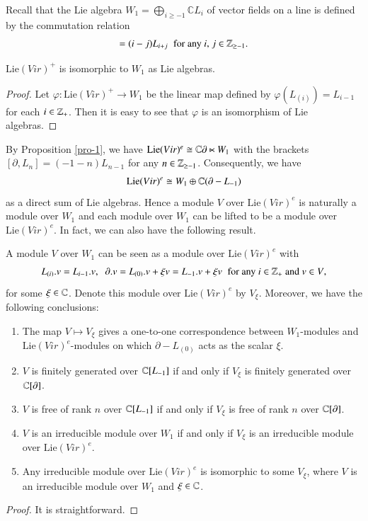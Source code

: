\documentclass[12pt]{amsart}
\begin{document}
Recall that the Lie algebra $W_1=\bigoplus_{i\geq -1}\mathbb{C}L_i$ of vector fields on a line is defined by the commutation relation
\begin{eqnarray*}
[L_i, L_j]=(i-j)L_{i+j}\;\;\text{for any $i$, $j\in \Z_{\geq -1}$.}
\end{eqnarray*}

\begin{pro}\label{pro-1}
$\text{Lie}( Vir)^+$ is isomorphic to $W_1$ as Lie algebras.
\end{pro}
\begin{proof}
Let $\varphi: \text{Lie}( Vir)^+\rightarrow W_1 $ be the linear map defined by $\varphi(L_{(i)})=L_{i-1}$ for each $i\in \mathbb{Z}_{+}$. Then it is easy to see that $\varphi$ is an isomorphism of Lie algebras.
\end{proof}

By Proposition \ref{pro-1}, we have $\text{Lie}( Vir)^e\cong \mathbb{C} \partial \ltimes W_1$ with
the brackets $[\partial, L_n]=(-1-n)L_{n-1}$ for any $n\in \mathbb{Z}_{\geq -1}$. Consequently, we have
$$\text{Lie}( Vir)^e\cong W_1\oplus \mathbb{C}(\partial-L_{-1})$$
as a direct sum of Lie algebras. Hence a module $V$ over $\text{Lie}( Vir)^e$ is naturally %
a module over $W_1$ and each module over $W_1$ can be lifted to be a module over $\text{Lie}( Vir)^e$. In fact, we can also have the following result.
\begin{cor}\label{cor-4}
A module $V$ over $W_1$ can be seen as a module over $\text{Lie}( Vir)^e$ with
\begin{eqnarray}
L_{(i)}. v=L_{i-1}. v,\;\; \partial. v=L_{(0)}.v+\xi v=L_{-1}.v+\xi v\;\;\text{for any $i\in \mathbb{Z}_+$ and $v\in V$,}
\end{eqnarray}
for some $\xi\in \mathbb{C}$. Denote this module over $\text{Lie}( Vir)^e$ by $V_\xi$. %
Moreover, we have the following conclusions:
\begin{enumerate}
\item The map $V\mapsto V_\xi$ gives a one-to-one correspondence between $W_1$-modules and $\text{Lie}( Vir)^e$-modules on which $\partial-L_{(0)}$ acts as the scalar $\xi$.
\item $V$ is finitely generated over $\mathbb{C}[L_{-1}]$ if and only if $V_\xi$ is finitely generated over $\mathbb{C}[\partial]$.
\item $V$ is free of rank $n$ over $\mathbb{C}[L_{-1}]$ if and only if $V_\xi$ is free of rank $n$ over $\mathbb{C}[\partial]$.
\item $V$ is an irreducible module over $W_1$ if and only if $V_\xi$ is an irreducible  module over $\text{Lie}( Vir)^e$.
\item Any irreducible module over $\text{Lie}(Vir)^e$ is isomorphic to some $V_{\xi}$, where $V$ is an irreducible module over $W_1$ and $\xi\in \mathbb{C}$.
\end{enumerate}
\end{cor}
\begin{proof}
It is straightforward.
\end{proof}
\end{document}
